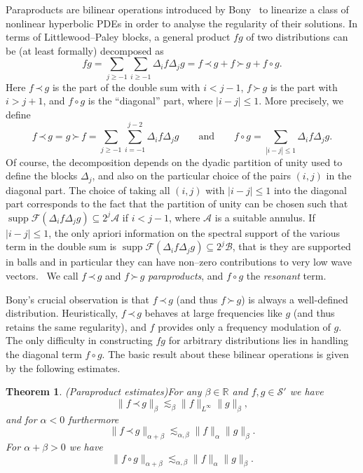 \documentclass[a4paper,11pt]{article}
\newcommand{\tmop}[1]{\ensuremath{\operatorname{#1}}}
\newcommand{\tmtextit}[1]{{\itshape{#1}}}
\newtheorem{theorem}{Theorem}
\newcommand{\CA}{\mathscr{A}}
\newcommand{\CB}{\mathscr{B}}
\newcommand{\CF}{\mathscr{F}}
\newcommand{\CS}{\mathscr{S}}
\newcommand{\lpara}{\,\mathord{\prec}\,}
\newcommand{\rpara}{\,\mathord{\succ}\,}
\newcommand{\reso}{\,\mathord{\circ}\,}
\begin{document}
Paraproducts are bilinear operations introduced by Bony~{\cite{Bony1981}} to
linearize a class of nonlinear hyperbolic PDEs in order to analyse the
regularity of their solutions. In terms of Littlewood--Paley blocks, a general
product $fg$ of two distributions can be (at least formally) decomposed as
\[ fg = \sum_{j \geqslant - 1} \sum_{i \geqslant - 1} \Delta_i f \Delta_j g =
   f \lpara g + f \rpara g + f \reso g. \]
Here $f \lpara g$ is the part of the double sum with $i < j - 1$, $f \rpara g$
is the part with $i > j + 1$, and $f \reso g$ is the ``diagonal'' part, where
$|i - j| \leqslant 1$. More precisely, we define
\[ f \lpara g = g \rpara f = \sum_{j \geqslant - 1} \sum_{i = - 1}^{j - 2}
   \Delta_i f \Delta_j g \hspace{2em} \text{and} \hspace{2em} f \reso g =
   \sum_{|i - j| \leqslant 1} \Delta_i f \Delta_j g. \]
Of course, the decomposition depends on the dyadic partition of unity used to
define the blocks $\Delta_j$, and also on the particular choice of the pairs
$(i, j)$ in the diagonal part. The choice of taking all $(i, j)$ with $|i - j|
\leqslant 1$ into the diagonal part corresponds to the fact that the partition
of unity can be chosen such that $\tmop{supp} \CF (\Delta_i f \Delta_j g)
\subseteq 2^j \CA$ if $i < j - 1$, where $\CA$ is a suitable annulus. If $| i
- j | \leqslant 1$, the only apriori information on the spectral support of
the various term in the double sum is $\tmop{supp} \CF (\Delta_i f \Delta_j g)
\subseteq 2^j \CB$, that is they are supported in balls and in particular they
can have non--zero contributions to very low wave vectors. \ We call $f \lpara
g$ and $f \rpara g$ \tmtextit{paraproducts}, and $f \reso g$ the
\tmtextit{resonant} term.

Bony's crucial observation is that $f \lpara g$ (and thus $f \rpara g$) is
always a well-defined distribution. Heuristically, $f \lpara g$ behaves at
large frequencies like $g$ (and thus retains the same regularity), and $f$
provides only a frequency modulation of $g$. The only difficulty in
constructing $fg$ for arbitrary distributions lies in handling the diagonal
term $f \reso g$. The basic result about these bilinear operations is given by
the following estimates.

\begin{theorem}
  (Paraproduct estimates)\label{thm:paraproduct} For any $\beta \in
  \mathbb{R}$ and $f, g \in \CS'$ we have
  \begin{equation}
    \label{eq:para-1} \|f \lpara g\|_{\beta} \lesssim_{\beta}
    \|f\|_{L^{\infty}} \|g\|_{\beta},
  \end{equation}
  and for $\alpha < 0$ furthermore
  \begin{equation}
    \label{eq:para-2} \|f \lpara g\|_{\alpha + \beta} \lesssim_{\alpha, \beta}
    \|f\|_{\alpha} \|g\|_{\beta} .
  \end{equation}
  For $\alpha + \beta > 0$ we have
  \begin{equation}
    \label{eq:para-3} \|f \reso g\|_{\alpha + \beta} \lesssim_{\alpha, \beta}
    \|f\|_{\alpha} \|g\|_{\beta} .
  \end{equation}
\end{theorem}
\end{document}
